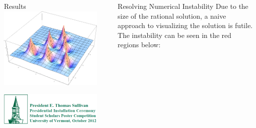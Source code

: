 \documentclass[final]{beamer}
\begin{document}
\begin{frame}{}
\begin{columns}[t]
\begin{column}{.35\linewidth}
\begin{block}{Results}
\vspace{3cm}
\centering
\includegraphics[width=700px]{3rd_order_many_peaks.png}
\\[1ex]

		\end{block}
	
\vspace{1cm}
  		
  		\includegraphics[width=1\linewidth]{SSPC_logo.pdf}

	\end{column}
	
	\begin{column}{.005\linewidth}	
\end{column}  

\begin{column}{.35\linewidth}
\begin{block}{Resolving Numerical Instability}
	Due to the size of the rational solution, a naive approach to visualizing the solution is futile. The instability can be seen in the red regions below:
	

\end{block}
\end{column}
\end{columns}
\end{frame}
\end{document}
